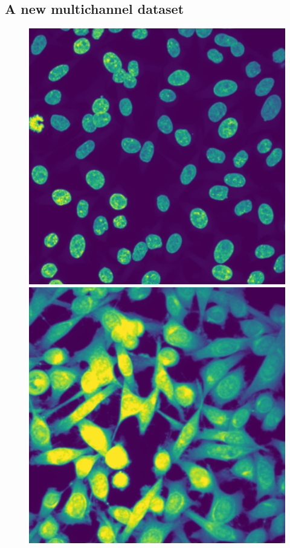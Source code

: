 \subsection{A new multichannel dataset}
\label{subsec:segmentation_data}

\begin{figure}[]
	\centering
		\includegraphics[width=0.95\linewidth]{figures/chapter3/dapi_BICD2}
		\vfill
		\includegraphics[width=0.95\linewidth]{figures/chapter3/cellmask_BICD2}

\end{figure}
